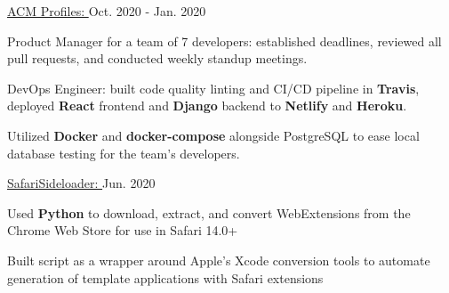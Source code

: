
\begin{cventries}

  \cvproject
  {\href{https://elated-pike-6f8e56.netlify.app/}{ACM Profiles: }} %
  {Oct. 2020 - Jan. 2020} %
  {
    \begin{cvitems} %
      \item {Product Manager for a team of 7 developers: established deadlines, reviewed all pull requests, and conducted weekly standup meetings.}
      \item {DevOps Engineer: built code quality linting and CI/CD pipeline in \textbf{Travis}, deployed \textbf{React} frontend and \textbf{Django} backend to \textbf{Netlify} and \textbf{Heroku}.}
      \item {Utilized \textbf{Docker} and \textbf{docker-compose} alongside PostgreSQL to ease local database testing for the team's developers.}
    \end{cvitems}
  }

  \cvproject
    {\href{https://github.com/hexalellogram/SafariSideloader}{SafariSideloader: }} %
    {Jun. 2020} %
    {
      \begin{cvitems} %
        \item {Used \textbf{Python} to download, extract, and convert WebExtensions from the Chrome Web Store for use in Safari 14.0+}
        \item {Built script as a wrapper around Apple's Xcode conversion tools to automate generation of template applications with Safari extensions}
      \end{cvitems}
    }


\end{cventries}
